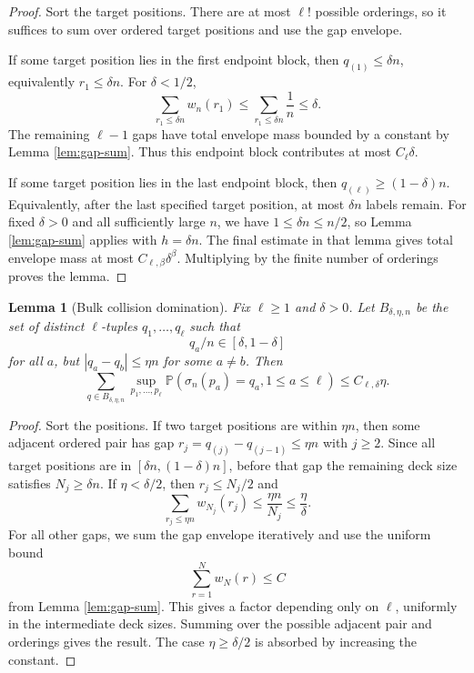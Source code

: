 \documentclass[11pt]{article}
\newtheorem{lemma}[theorem]{Lemma}
\theoremstyle{remark}
\newcommand{\Pp}{\mathbb P}
\begin{document}
\begin{proof}
Sort the target positions.  There are at most \(\ell!\) possible orderings, so it suffices to sum over ordered target positions and use the gap envelope.

If some target position lies in the first endpoint block, then \(q_{(1)}\le\delta n\), equivalently \(r_1\le\delta n\).  For \(\delta<1/2\),
\[
        \sum_{r_1\le\delta n}w_n(r_1)
        \le \sum_{r_1\le\delta n}\frac1n\le\delta.
\]
The remaining \(\ell-1\) gaps have total envelope mass bounded by a constant by Lemma \ref{lem:gap-sum}.  Thus this endpoint block contributes at most \(C_\ell\delta\).

If some target position lies in the last endpoint block, then \(q_{(\ell)}\ge(1-\delta)n\).  Equivalently, after the last specified target position, at most \(\delta n\) labels remain.  For fixed \(\delta>0\) and all sufficiently large \(n\), we have \(1\le\delta n\le n/2\), so Lemma \ref{lem:gap-sum} applies with \(h=\delta n\).  The final estimate in that lemma gives total envelope mass at most \(C_{\ell,\beta}\delta^\beta\).  Multiplying by the finite number of orderings proves the lemma.
\end{proof}



\begin{lemma}[Bulk collision domination]\label{lem:collision-dom}
Fix \(\ell\ge1\) and \(\delta>0\).  Let \(B_{\delta,\eta,n}\) be the set of distinct \(\ell\)-tuples \(q_1,\ldots,q_\ell\) such that
\[
        q_a/n\in[\delta,1-\delta]
\]
for all \(a\), but \(|q_a-q_b|\le\eta n\) for some \(a\ne b\).  Then
\[
\sum_{q\in B_{\delta,\eta,n}}
\sup_{p_1,\ldots,p_\ell}
\Pp(\sigma_n(p_a)=q_a,1\le a\le\ell)
\le C_{\ell,\delta}\eta.
\]
\end{lemma}

\begin{proof}
Sort the positions.  If two target positions are within \(\eta n\), then some adjacent ordered pair has gap \(r_j=q_{(j)}-q_{(j-1)}\le\eta n\) with \(j\ge2\).  Since all target positions are in \([\delta n,(1-\delta)n]\), before that gap the remaining deck size satisfies \(N_j\ge\delta n\).  If \(\eta<\delta/2\), then \(r_j\le N_j/2\) and
\[
        \sum_{r_j\le\eta n}w_{N_j}(r_j)
        \le \frac{\eta n}{N_j}
        \le \frac{\eta}{\delta}.
\]
For all other gaps, we sum the gap envelope iteratively and use the uniform bound
\[
        \sum_{r=1}^N w_N(r)\le C
\]
from Lemma \ref{lem:gap-sum}.  This gives a factor depending only on \(\ell\), uniformly in the intermediate deck sizes.  Summing over the possible adjacent pair and orderings gives the result.  The case \(\eta\ge\delta/2\) is absorbed by increasing the constant.
\end{proof}
\end{document}
